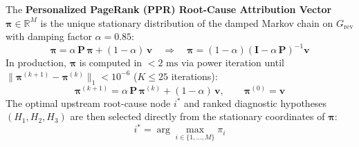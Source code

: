 The \textbf{Personalized PageRank (PPR) Root-Cause Attribution Vector} $\boldsymbol{\pi} \in \mathbb{R}^M$ is the unique stationary distribution of the damped Markov chain on $G_{\text{rev}}$ with damping factor $\alpha = 0.85$:
\begin{equation}
\boldsymbol{\pi} = \alpha \, \mathbf{P} \, \boldsymbol{\pi} + (1 - \alpha) \, \mathbf{v} \quad \Longrightarrow \quad \boldsymbol{\pi} = (1 - \alpha) \left( \mathbf{I} - \alpha \, \mathbf{P} \right)^{-1} \mathbf{v}
\label{eq:ppr_closed}
\end{equation}
In production, $\boldsymbol{\pi}$ is computed in $<2\text{ ms}$ via power iteration until $\|\boldsymbol{\pi}^{(k+1)} - \boldsymbol{\pi}^{(k)}\|_1 < 10^{-6}$ ($K \le 25$ iterations):
\begin{equation}
\boldsymbol{\pi}^{(k+1)} = \alpha \, \mathbf{P} \, \boldsymbol{\pi}^{(k)} + (1 - \alpha) \, \mathbf{v}, \qquad \boldsymbol{\pi}^{(0)} = \mathbf{v}
\label{eq:ppr_iter}
\end{equation}
The optimal upstream root-cause node $i^*$ and ranked diagnostic hypotheses $(H_1, H_2, H_3)$ are then selected directly from the stationary coordinates of $\boldsymbol{\pi}$:
\begin{equation}
i^* = \arg\max_{i \in \{1, \dots, M\}} \pi_i
\label{eq:ppr_argmax}
\end{equation}


